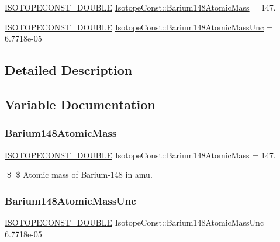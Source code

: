 \begin{DoxyCompactItemize}
\item 
\mbox{\hyperlink{group___isotope_const-_macros_ga8f45a7272ce02c0b4c65c44636ed719a}{I\+S\+O\+T\+O\+P\+E\+C\+O\+N\+S\+T\+\_\+\+D\+O\+U\+B\+LE}} \mbox{\hyperlink{group___isotope_const-_barium-_ba148_ga1c990e90e52eb160f38e6bebdc41ddd2}{Isotope\+Const\+::\+Barium148\+Atomic\+Mass}} = 147.
\item 
\mbox{\hyperlink{group___isotope_const-_macros_ga8f45a7272ce02c0b4c65c44636ed719a}{I\+S\+O\+T\+O\+P\+E\+C\+O\+N\+S\+T\+\_\+\+D\+O\+U\+B\+LE}} \mbox{\hyperlink{group___isotope_const-_barium-_ba148_ga5f632ed174309f1ab1fe01368c6d0f51}{Isotope\+Const\+::\+Barium148\+Atomic\+Mass\+Unc}} = 6.\+7718e-\/05
\end{DoxyCompactItemize}


\subsection{Detailed Description}


\subsection{Variable Documentation}
\mbox{\label{group___isotope_const-_barium-_ba148_ga1c990e90e52eb160f38e6bebdc41ddd2}} 
\subsubsection{\texorpdfstring{Barium148\+Atomic\+Mass}{Barium148AtomicMass}}
{\footnotesize\ttfamily \mbox{\hyperlink{group___isotope_const-_macros_ga8f45a7272ce02c0b4c65c44636ed719a}{I\+S\+O\+T\+O\+P\+E\+C\+O\+N\+S\+T\+\_\+\+D\+O\+U\+B\+LE}} Isotope\+Const\+::\+Barium148\+Atomic\+Mass = 147.}

\$ \$ Atomic mass of Barium-\/148 in amu. \mbox{\label{group___isotope_const-_barium-_ba148_ga5f632ed174309f1ab1fe01368c6d0f51}} 
\subsubsection{\texorpdfstring{Barium148\+Atomic\+Mass\+Unc}{Barium148AtomicMassUnc}}
{\footnotesize\ttfamily \mbox{\hyperlink{group___isotope_const-_macros_ga8f45a7272ce02c0b4c65c44636ed719a}{I\+S\+O\+T\+O\+P\+E\+C\+O\+N\+S\+T\+\_\+\+D\+O\+U\+B\+LE}} Isotope\+Const\+::\+Barium148\+Atomic\+Mass\+Unc = 6.\+7718e-\/05}


